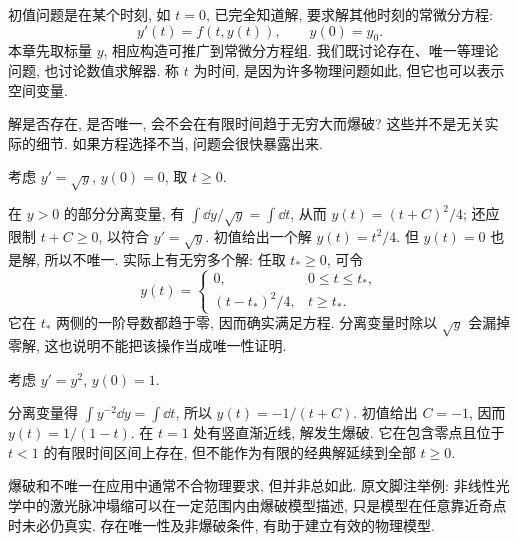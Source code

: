 \label{ch:ode}


初值问题是在某个时刻, 如 $t=0$, 已完全知道解, 要求解其他时刻的常微分方程:
\[
y'(t)=f(t,y(t)),\qquad y(0)=y_0.
\]
本章先取标量 $y$, 相应构造可推广到常微分方程组. 我们既讨论存在、唯一等理论问题, 也讨论数值求解器. 称 $t$ 为时间, 是因为许多物理问题如此, 但它也可以表示空间变量.

解是否存在, 是否唯一, 会不会在有限时间趋于无穷大而爆破? 这些并不是无关实际的细节. 如果方程选择不当, 问题会很快暴露出来.

\begin{example}\label{ex:ode-nonunique}
考虑 $y'=\sqrt y$, $y(0)=0$, 取 $t\geq0$.
\end{example}
\begin{solution}
在 $y>0$ 的部分分离变量, 有 $\int\dd y/\sqrt y=\int\dd t$, 从而 $y(t)=(t+C)^2/4$; 还应限制 $t+C\geq0$, 以符合 $y'=\sqrt y$. 初值给出一个解 $y(t)=t^2/4$. 但 $y(t)=0$ 也是解, 所以不唯一. 实际上有无穷多个解: 任取 $t_*\geq0$, 可令
\[
y(t)=\begin{cases}0,&0\leq t\leq t_*,\\(t-t_*)^2/4,&t\geq t_*.
\end{cases}
\]
它在 $t_*$ 两侧的一阶导数都趋于零, 因而确实满足方程. 分离变量时除以 $\sqrt y$ 会漏掉零解, 这也说明不能把该操作当成唯一性证明.
\end{solution}

\begin{example}\label{ex:ode-blowup}
考虑 $y'=y^2$, $y(0)=1$.
\end{example}
\begin{solution}
分离变量得 $\int y^{-2}\dd y=\int\dd t$, 所以 $y(t)=-1/(t+C)$. 初值给出 $C=-1$, 因而 $y(t)=1/(1-t)$. 在 $t=1$ 处有竖直渐近线, 解发生爆破. 它在包含零点且位于 $t<1$ 的有限时间区间上存在, 但不能作为有限的经典解延续到全部 $t\geq0$.
\end{solution}

爆破和不唯一在应用中通常不合物理要求, 但并非总如此. 原文脚注举例: 非线性光学中的激光脉冲塌缩可以在一定范围内由爆破模型描述, 只是模型在任意靠近奇点时未必仍真实. 存在唯一性及非爆破条件, 有助于建立有效的物理模型.

